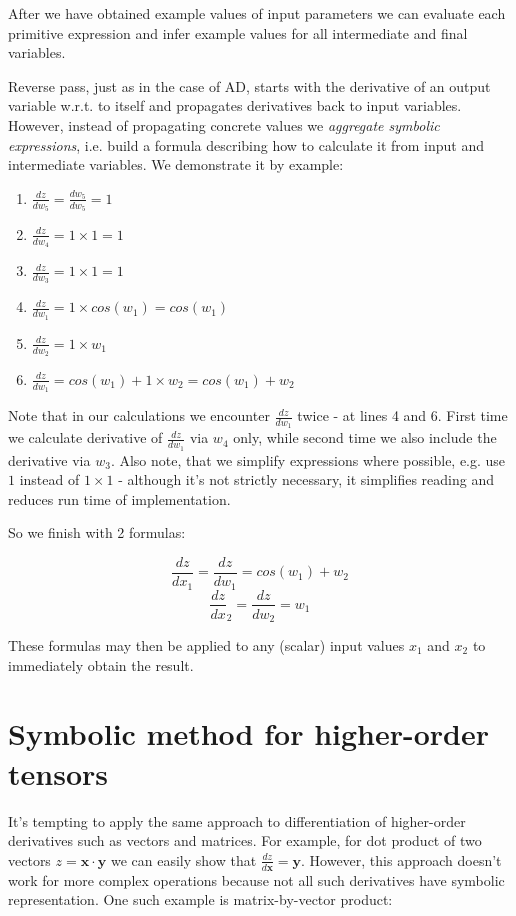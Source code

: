 \documentclass[conference]{IEEEtran}
\begin{document}
After we have obtained example values of input parameters we can
evaluate each primitive expression and infer example values for all
intermediate and final variables.

Reverse pass, just as in the case of AD, starts with the derivative of
an output variable w.r.t. to itself and propagates derivatives back to
input variables. However, instead of propagating concrete values we
\textit{aggregate symbolic expressions}, i.e. build a formula
describing how to calculate it from input and intermediate
variables. We demonstrate it by example:

\begin{enumerate}
\item $\frac{dz}{dw_5} = \frac{dw_5}{dw_5} = 1$
\item $\frac{dz}{dw_4} = 1 \times 1 = 1$
\item $\frac{dz}{dw_3} = 1 \times 1 = 1$
\item $\frac{dz}{dw_1} = 1 \times cos(w_1) = cos(w_1)$
\item $\frac{dz}{dw_2} = 1 \times w_1$
\item $\frac{dz}{dw_1} = cos(w_1) + 1 \times w_2 = cos(w_1) + w_2$
\end{enumerate}

Note that in our calculations we encounter $\frac{dz}{dw_1}$ twice -
at lines 4 and 6. First time we calculate derivative of
$\frac{dz}{dw_1}$ via $w_4$ only, while second time we also include
the derivative via $w_3$. Also note, that we simplify expressions
where possible, e.g. use $1$ instead of $1 \times 1$ - although it's
not strictly necessary, it simplifies reading and reduces run time of
implementation.

So we finish with 2 formulas:

$$\frac{dz}{dx_1} = \frac{dz}{dw_1} = cos(w_1) + w_2$$
$$\frac{dz}{dx}_2 = \frac{dz}{dw_2} = w_1$$

These formulas may then be applied to any (scalar) input values $x_1$ and $x_2$
to immediately obtain the result.

\section{Symbolic method for higher-order tensors}

It's tempting to apply the same approach to differentiation of
higher-order derivatives such as vectors and matrices. For example,
for dot product of two vectors $z = \pmb{x} \cdot \pmb{y}$ we can
easily show that $\frac{dz}{d\pmb{x}} = \pmb{y}$. However, this
approach doesn't work for more complex operations because not all such
derivatives have symbolic representation. One such example is
matrix-by-vector product:
\end{document}
